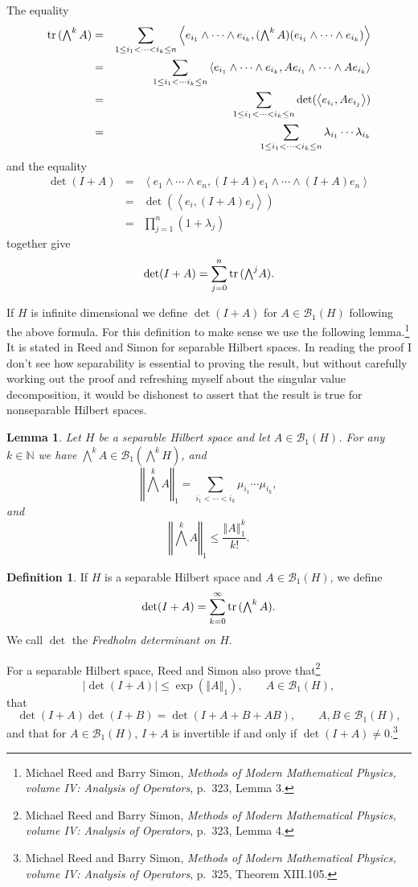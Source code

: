 \documentclass{article}
\newcommand{\inner}[2]{\left\langle #1, #2 \right\rangle}
\newcommand{\tr}{\ensuremath\mathrm{tr}\,}
\newcommand{\norm}[1]{\left\Vert #1 \right\Vert}
\newtheorem{lemma}[theorem]{Lemma}
\theoremstyle{definition}
\newtheorem{definition}[theorem]{Definition}
\begin{document}
The equality
\begin{eqnarray*}
\tr(\textstyle{\bigwedge^k A})&=&\sum_{1 \leq i_1 < \cdots < i_k \leq n} \inner{e_{i_1} \wedge \cdots \wedge e_{i_k}}{(\textstyle{\bigwedge^k A})(e_{i_1} \wedge \cdots \wedge e_{i_k})}\\
&=&\sum_{1 \leq i_1 < \cdots i_k \leq n} \inner{e_{i_1} \wedge \cdots \wedge e_{i_k}}{Ae_{i_1} \wedge \cdots \wedge Ae_{i_k}}\\
&=&\sum_{1 \leq i_1 < \cdots < i_k \leq n} \det(\inner{e_{i_i}}{Ae_{i_j}})\\
&=&\sum_{1 \leq i_1 < \cdots < i_k \leq n} \lambda_{i_1} \cdots \lambda_{i_k}
\end{eqnarray*}
and the equality
\begin{eqnarray*}
\det(I+A)&=&\inner{e_1\wedge \cdots \wedge e_n}{(I+A)e_1 \wedge \cdots \wedge (I+A)e_n}\\
&=&\det(\inner{e_i}{(I+A)e_j})\\
&=&\prod_{j=1}^n (1+\lambda_j)
\end{eqnarray*}
together give
\[
\det(I+A)=\sum_{j=0}^n \tr(\textstyle{\bigwedge^j}A).
\]

If $H$ is infinite dimensional we define $\det(I+A)$ for $A \in \mathscr{B}_1(H)$ following the above formula.
For this definition to make sense we use the following lemma.\footnote{Michael
Reed and Barry Simon, {\em Methods of Modern Mathematical Physics, volume IV: Analysis of Operators}, p.~323, Lemma 3.} It is stated in Reed and Simon for separable
Hilbert spaces. In reading the proof I don't see how separability is essential to proving the result, but without carefully working out the proof and refreshing myself about the
singular value decomposition, it would be dishonest to assert that the result  is true for nonseparable Hilbert spaces.

\begin{lemma}
Let $H$ be a separable Hilbert space and let $A \in \mathscr{B}_1(H)$. For any $k \in \mathbb{N}$ we have
$\bigwedge^k A \in \mathscr{B}_1(\bigwedge^k H)$, and
\[
\norm{\textstyle{\bigwedge^k A}}_1 = \sum_{i_1<\cdots < i_k} \mu_{i_1} \cdots \mu_{i_k},
\]
and
\[
\norm{\textstyle{\bigwedge^k A}}_1 \leq \frac{\norm{A}_1^k}{k!}.
\]
\end{lemma}



\begin{definition}
If $H$ is a separable Hilbert space and
$A \in \mathscr{B}_1(H)$, we define
\[
\det(I+A) = \sum_{k=0}^\infty \tr(\textstyle{\bigwedge^k A}).
\]
We call  $\det$ the {\em Fredholm determinant on $H$}.
\end{definition}

For a separable Hilbert space,
Reed and Simon also prove that\footnote{Michael
Reed and Barry Simon, {\em Methods of Modern Mathematical Physics, volume IV: Analysis of Operators}, p.~323, Lemma 4.}
\[
|\det(I+A)| \leq \exp(\norm{A}_1), \qquad A \in \mathscr{B}_1(H),
\]
that
\[
\det(I+A)\det(I+B) = \det(I+A+B+AB), \qquad A,B \in \mathscr{B}_1(H),
\]
and that for $A \in \mathscr{B}_1(H)$,
$I+A$ is invertible if and only if $\det (I+A) \neq 0$.\footnote{Michael
Reed and Barry Simon, {\em Methods of Modern Mathematical Physics, volume IV: Analysis of Operators}, p.~325, Theorem XIII.105.}
\end{document}
